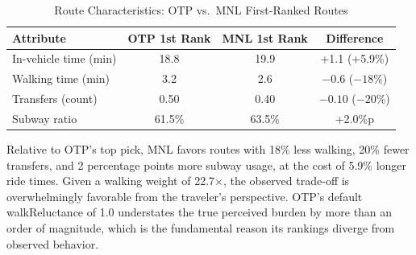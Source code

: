 \begin{table}[htbp]
\centering
\tablefont
\begin{tabular}{|l|c|c|c|}
\hline
\headrow
\textbf{Attribute} & \textbf{OTP 1st Rank} & \textbf{MNL 1st Rank} & \textbf{Difference} \\
\hline
In-vehicle time (min) & 18.8   & 19.9   & +1.1 (+5.9\%)    \\
\hline
Walking time (min)    & 3.2    & 2.6    & $-0.6$ ($-18$\%) \\
\hline
Transfers (count)     & 0.50   & 0.40   & $-0.10$ ($-20$\%) \\
\hline
Subway ratio          & 61.5\% & 63.5\% & +2.0\%p          \\
\hline
\end{tabular}
\caption{Route Characteristics: OTP vs.\ MNL First-Ranked Routes}
\end{table}

Relative to OTP's top pick, MNL favors routes with 18\% less walking, 20\%
fewer transfers, and 2 percentage points more subway usage, at the cost of
5.9\% longer ride times. Given a walking weight of 22.7$\times$, the observed
trade-off is overwhelmingly favorable from the traveler's perspective. OTP's
default walkReluctance of 1.0 understates the true perceived burden by more
than an order of magnitude, which is the fundamental reason its rankings
diverge from observed behavior.

\FloatBarrier
